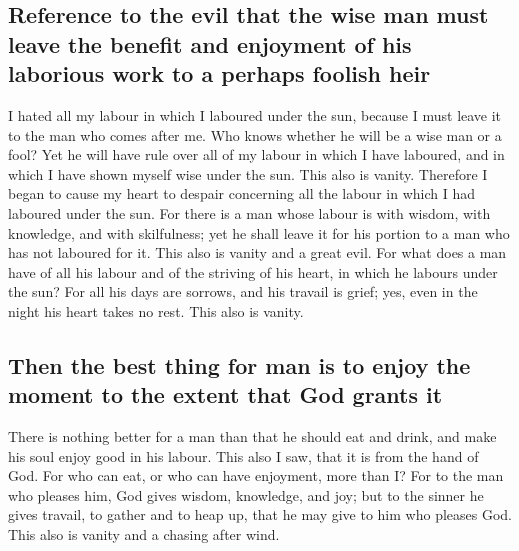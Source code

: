 \hypertarget{reference-to-the-evil-that-the-wise-man-must-leave-the-benefit-and-enjoyment-of-his-laborious-work-to-a-perhaps-foolish-heir}{%
\subsection{Reference to the evil that the wise man must leave the
benefit and enjoyment of his laborious work to a perhaps foolish
heir}\label{reference-to-the-evil-that-the-wise-man-must-leave-the-benefit-and-enjoyment-of-his-laborious-work-to-a-perhaps-foolish-heir}}

 I hated all my labour in which I laboured under the sun,
because I must leave it to the man who comes after me. 
Who knows whether he will be a wise man or a fool? Yet he will have rule
over all of my labour in which I have laboured, and in which I have
shown myself wise under the sun. This also is vanity. 
Therefore I began to cause my heart to despair concerning all the labour
in which I had laboured under the sun.  For there is a
man whose labour is with wisdom, with knowledge, and with skilfulness;
yet he shall leave it for his portion to a man who has not laboured for
it. This also is vanity and a great evil.  For what does
a man have of all his labour and of the striving of his heart, in which
he labours under the sun?  For all his days are sorrows,
and his travail is grief; yes, even in the night his heart takes no
rest. This also is vanity.

\hypertarget{then-the-best-thing-for-man-is-to-enjoy-the-moment-to-the-extent-that-god-grants-it}{%
\subsection{Then the best thing for man is to enjoy the moment to the
extent that God grants
it}\label{then-the-best-thing-for-man-is-to-enjoy-the-moment-to-the-extent-that-god-grants-it}}

 There is nothing better for a man than that he should
eat and drink, and make his soul enjoy good in his labour. This also I
saw, that it is from the hand of God.  For who can eat,
or who can have enjoyment, more than I?  For to the man
who pleases him, God gives wisdom, knowledge, and joy; but to the sinner
he gives travail, to gather and to heap up, that he may give to him who
pleases God. This also is vanity and a chasing after wind.

